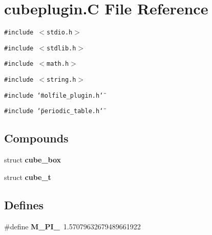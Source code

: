 \section{cubeplugin.C File Reference}
\label{cubeplugin_8C}
{\tt \#include $<$stdio.h$>$}\par
{\tt \#include $<$stdlib.h$>$}\par
{\tt \#include $<$math.h$>$}\par
{\tt \#include $<$string.h$>$}\par
{\tt \#include \char`\"{}molfile\_\-plugin.h\char`\"{}}\par
{\tt \#include \char`\"{}periodic\_\-table.h\char`\"{}}\par
\subsection*{Compounds}
\begin{CompactItemize}
\item 
struct {\bf cube\_\-box}
\item 
struct {\bf cube\_\-t}
\end{CompactItemize}
\subsection*{Defines}
\begin{CompactItemize}
\item 
\#define {\bf M\_\-PI\_}\ 1.57079632679489661922
\end{CompactItemize}
